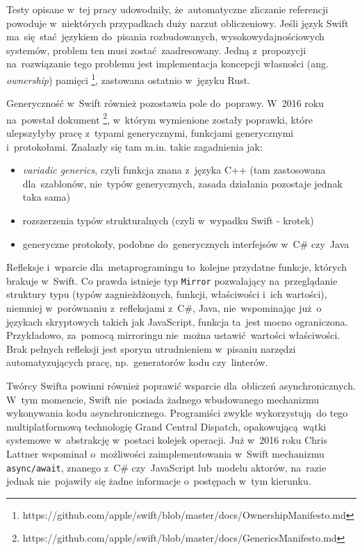 \documentclass[mgr, shortabstract]{iithesis}
\newcommand{\ang}[1]{ang. \textit{#1}}
\newcommand{\swiftinline}[1]{
    \texttt{#1}
}
\begin{document}
Testy opisane w~tej pracy udowodniły, że~automatyczne zliczanie referencji powoduje w~niektórych przypadkach duży narzut obliczeniowy. Jeśli język Swift ma~się stać językiem do~pisania rozbudowanych, wysokowydajnościowych systemów, problem ten musi zostać zaadresowany. Jedną z~propozycji na~rozwiązanie tego problemu jest implementacja koncepcji własności (\ang{ownership}) pamięci \footnote{https://github.com/apple/swift/blob/master/docs/OwnershipManifesto.md}, zastowana ostatnio w~języku Rust. 

Generyczność w~Swift również pozostawia pole do~poprawy. W~2016 roku na~powstał dokument \footnote{https://github.com/apple/swift/blob/master/docs/GenericsManifesto.md}, w~którym wymienione zostały poprawki, które ulepszyłyby pracę z~typami generycznymi, funkcjami generycznymi i~protokołami. Znalazły się tam m.in. takie zagadnienia jak:
\begin{itemize}
    \item \textit{variadic generics}, czyli funkcja znana z~języka C++ (tam zastosowana dla~szablonów, nie~typów generycznych, zasada działania pozostaje jednak taka sama)
    \item rozszerzenia typów strukturalnych (czyli w~wypadku Swift - krotek)
    \item generyczne protokoły, podobne do~generycznych interfejsów w~C\# czy~Java
\end{itemize}

Refleksje i~wparcie dla~metaprogramingu to~kolejne przydatne funkcje, których brakuje w~Swift. Co prawda istnieje typ \swiftinline{Mirror} pozwalający na~przeglądanie struktury typu (typów zagnieżdżonych, funkcji, właściwości i~ich wartości), niemniej w~porównaniu z~refleksjami z~C\#, Java, nie~wspominając już o językach skryptowych takich jak JavaScript, funkcja ta~jest mocno ograniczona. Przykładowo, za~pomocą mirroringu nie~można ustawić wartości właściwości. Brak pełnych refleksji jest sporym utrudnieniem w~pisaniu narzędzi automatyzujących pracę, np.~generatorów kodu czy~linterów.

Twórcy Swifta powinni również poprawić wsparcie dla~obliczeń asynchronicznych. W~tym momencie, Swift nie~posiada żadnego wbudowanego mechanizmu wykonywania kodu asynchronicznego. Programiści zwykle wykorzystują do tego multiplatformową technologię Grand Central Dispatch, opakowującą wątki systemowe w~abstrakcję w~postaci kolejek operacji. Już w~2016 roku Chris Lattner wspominał o~możliwości zaimplementowania w~Swift mechanizmu \texttt{async/await}, znanego z~C\# czy~JavaScript lub~modelu aktorów, na~razie jednak nie~pojawiły się żadne informacje o~postępach w~tym kierunku.
\end{document}
